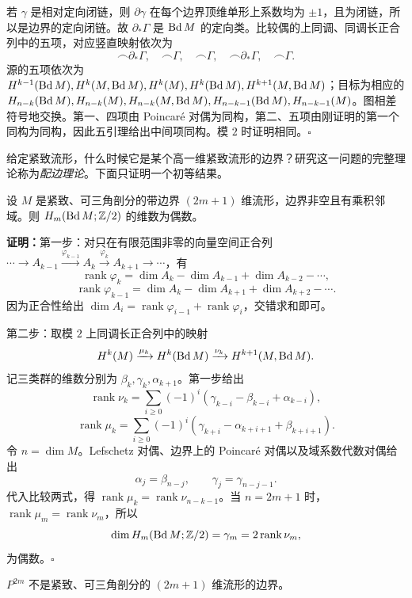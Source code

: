 若 $\gamma$ 是相对定向闭链，则 $\partial\gamma$ 在每个边界顶维单形上系数均为 $\pm1$，且为闭链，所以是边界的定向闭链。故 $\partial_*\Gamma$ 是 $\operatorname{Bd} M$ 的定向类。比较偶的上同调、同调长正合列中的五项，对应竖直映射依次为
\[\frown\partial_*\Gamma,\quad\frown\Gamma,\quad\frown\Gamma,\quad
\frown\partial_*\Gamma,\quad\frown\Gamma.\]
源的五项依次为 $H^{k-1}(\operatorname{Bd} M),H^k(M,\operatorname{Bd} M),H^k(M),H^k(\operatorname{Bd} M),H^{k+1}(M,\operatorname{Bd} M)$；目标为相应的 $H_{n-k}(\operatorname{Bd} M),H_{n-k}(M),H_{n-k}(M,\operatorname{Bd} M),H_{n-k-1}(\operatorname{Bd} M),H_{n-k-1}(M)$。图相差符号地交换。第一、四项由 Poincaré 对偶为同构，第二、五项由刚证明的第一个同构为同构，因此五引理给出中间项同构。模 $2$ 时证明相同。\hfill$\square$

给定紧致流形，什么时候它是某个高一维紧致流形的边界？研究这一问题的完整理论称为\emph{配边理论}。下面只证明一个初等结果。

设 $M$ 是紧致、可三角剖分的带边界 $(2m+1)$ 维流形，边界非空且有乘积邻域。则 $H_m(\operatorname{Bd} M;\mathbb{Z}/2)$ 的维数为偶数。

\textbf{证明：}第一步：对只在有限范围非零的向量空间正合列 $\cdots\to A_{k-1}\xrightarrow{\varphi_{k-1}}A_k\xrightarrow{\varphi_k}A_{k+1}\to\cdots$，有
\[
\operatorname{rank}\varphi_k=\dim A_k-\dim A_{k-1}+\dim A_{k-2}-\cdots,
\]
\[
\operatorname{rank}\varphi_{k-1}=\dim A_k-\dim A_{k+1}+\dim A_{k+2}-\cdots.
\]
因为正合性给出 $\dim A_i=\operatorname{rank}\varphi_{i-1}+\operatorname{rank}\varphi_i$，交错求和即可。

第二步：取模 $2$ 上同调长正合列中的映射
\[H^k(M)\xrightarrow{\mu_k}H^k(\operatorname{Bd} M)\xrightarrow{\nu_k}H^{k+1}(M,\operatorname{Bd} M).\]
记三类群的维数分别为 $\beta_k,\gamma_k,\alpha_{k+1}$。第一步给出
\[\operatorname{rank}\nu_k=\sum_{i\ge0}(-1)^i(\gamma_{k-i}-\beta_{k-i}+\alpha_{k-i}),\]
\[\operatorname{rank}\mu_k=\sum_{i\ge0}(-1)^i(\gamma_{k+i}-\alpha_{k+i+1}+\beta_{k+i+1}).\]
令 $n=\dim M$。Lefschetz 对偶、边界上的 Poincaré 对偶以及域系数代数对偶给出
\[\alpha_j=\beta_{n-j},\qquad\gamma_j=\gamma_{n-j-1}.\]
代入比较两式，得 $\operatorname{rank}\mu_k=\operatorname{rank}\nu_{n-k-1}$。当 $n=2m+1$ 时，$\operatorname{rank}\mu_m=\operatorname{rank}\nu_m$，所以
\[\dim H_m(\operatorname{Bd} M;\mathbb{Z}/2)=\gamma_m=2\operatorname{rank}\nu_m,\]
为偶数。\hfill$\square$

$P^{2m}$ 不是紧致、可三角剖分的 $(2m+1)$ 维流形的边界。

